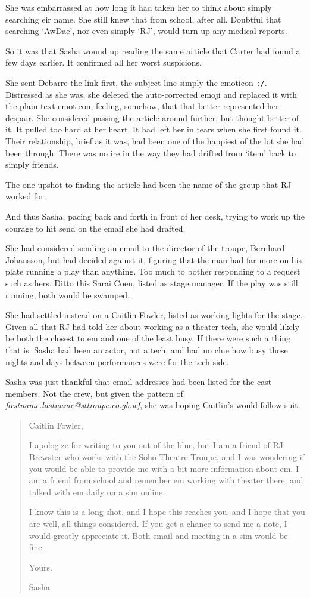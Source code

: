She was embarrassed at how long it had taken her to think about simply searching eir name. She still knew that from school, after all. Doubtful that searching `AwDae', nor even simply `RJ', would turn up any medical reports.

So it was that Sasha wound up reading the same article that Carter had found a few days earlier. It confirmed all her worst suspicions.

She sent Debarre the link first, the subject line simply the emoticon \texttt{:/}. Distressed as she was, she deleted the auto-corrected emoji and replaced it with the plain-text emoticon, feeling, somehow, that that better represented her despair. She considered passing the article around further, but thought better of it. It pulled too hard at her heart. It had left her in tears when she first found it. Their relationship, brief as it was, had been one of the happiest of the lot she had been through. There was no ire in the way they had drifted from `item' back to simply friends.

The one upshot to finding the article had been the name of the group that RJ worked for.

And thus Sasha, pacing back and forth in front of her desk, trying to work up the courage to hit send on the email she had drafted.

She had considered sending an email to the director of the troupe, Bernhard Johansson, but had decided against it, figuring that the man had far more on his plate running a play than anything. Too much to bother responding to a request such as hers. Ditto this Sarai Coen, listed as stage manager. If the play was still running, both would be swamped.

She had settled instead on a Caitlin Fowler, listed as working lights for the stage. Given all that RJ had told her about working as a theater tech, she would likely be both the closest to em and one of the least busy. If there were such a thing, that is. Sasha had been an actor, not a tech, and had no clue how busy those nights and days between performances were for the tech side.

Sasha was just thankful that email addresses had been listed for the cast members. Not the crew, but given the pattern of \emph{firstname.lastname@sttroupe.co.gb.wf}, she was hoping Caitlin's would follow suit.

\begin{quote}
Caitlin Fowler,

I apologize for writing to you out of the blue, but I am a friend of RJ Brewster who works with the Soho Theatre Troupe, and I was wondering if you would be able to provide me with a bit more information about em. I am a friend from school and remember em working with theater there, and talked with em daily on a sim online.

I know this is a long shot, and I hope this reaches you, and I hope that you are well, all things considered. If you get a chance to send me a note, I would greatly appreciate it. Both email and meeting in a sim would be fine.

Yours.

Sasha
\end{quote}

